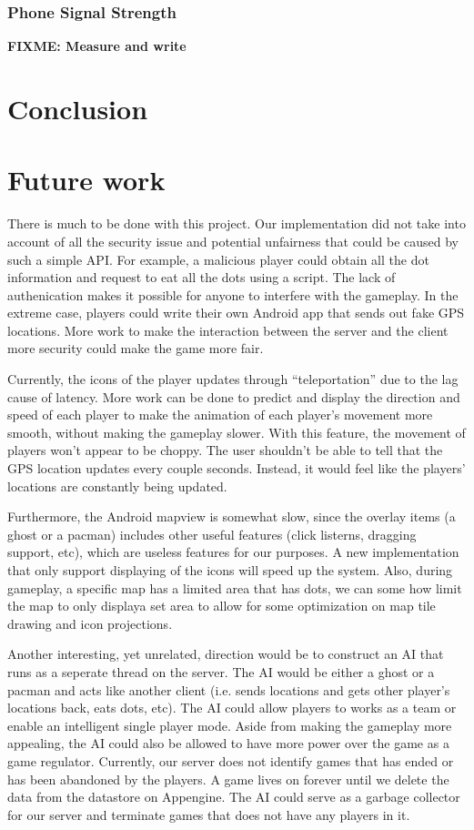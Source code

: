 \documentclass{acm_proc_article-sp}
\newcommand{\FIXME}[1]{{\color{red}\textbf{FIXME: #1}}}
\begin{document}
\subsubsection{Phone Signal Strength}
\FIXME{Measure and write}

\section{Conclusion}

\section{Future work}
\label{future}

There is much to be done with this project. Our implementation did not
take into account of all the security issue and potential unfairness
that could be caused by such a simple API. For example, a malicious
player could obtain all the dot information and request to eat all the
dots using a script. The lack of authenication makes it possible for
anyone to interfere with the gameplay. In the extreme case, players
could write their own Android app that sends out fake GPS
locations. More work to make the interaction between the server and
the client more security could make the game more fair.

Currently, the icons of the player updates through ``teleportation''
due to the lag cause of latency. More work can be done to predict and
display the direction and speed of each player to make the animation
of each player's movement more smooth, without making the gameplay
slower. With this feature, the movement of players won't appear to be
choppy. The user shouldn't be able to tell that the GPS location
updates every couple seconds. Instead, it would feel like the players'
locations are constantly being updated.

Furthermore, the Android mapview is somewhat slow, since the overlay
items (a ghost or a pacman) includes other useful features (click
listerns, dragging support, etc), which are useless features for our
purposes. A new implementation that only support displaying of the
icons will speed up the system. Also, during gameplay, a specific map
has a limited area that has dots, we can some how limit the map to
only displaya set area to allow for some optimization on map tile
drawing and icon projections.

Another interesting, yet unrelated, direction would be to construct an
AI that runs as a seperate thread on the server. The AI would be
either a ghost or a pacman and acts like another client (i.e. sends
locations and gets other player's locations back, eats dots, etc). The
AI could allow players to works as a team or enable an intelligent
single player mode. Aside from making the gameplay more appealing, the
AI could also be allowed to have more power over the game as a game
regulator. Currently, our server does not identify games that has
ended or has been abandoned by the players. A game lives on forever
until we delete the data from the datastore on Appengine. The AI could
serve as a garbage collector for our server and terminate games that
does not have any players in it.
\end{document}

